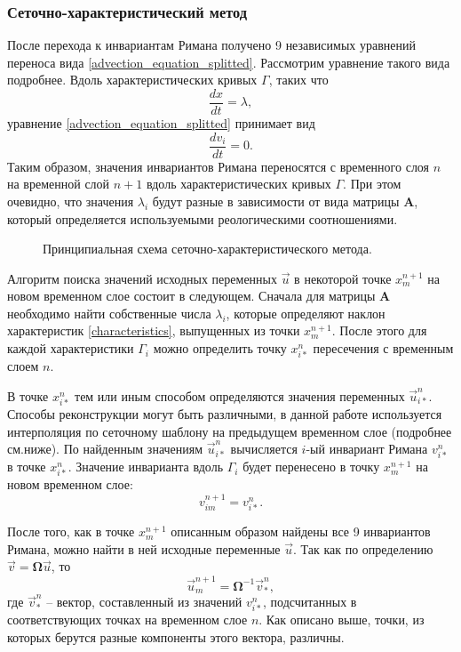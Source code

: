 \subsubsection{Сеточно-характеристический метод}

После перехода к инвариантам Римана получено 9 независимых уравнений переноса вида \ref{advection_equation_splitted}. Рассмотрим уравнение такого вида подробнее. Вдоль характеристических кривых $\Gamma$, таких что
\begin{equation}
\label{characteristics}
\frac{dx}{dt} = \lambda,
\end{equation}
уравнение \ref{advection_equation_splitted} принимает вид 
\begin{equation}
\label{characteristic_equation}
\frac{dv_i}{dt} = 0.
\end{equation}
Таким образом, значения инвариантов Римана переносятся с временного слоя $n$ на временной слой $n+1$ вдоль характеристических кривых $\Gamma$. При этом очевидно, что значения $\lambda_i$ будут разные в зависимости от вида матрицы $\mathbf A$, который определяется используемыми реологическими соотношениями.

\begin{figure}[h]
\caption{Принципиальная схема сеточно-характеристического метода.}
\end{figure}

Алгоритм поиска значений исходных переменных $\vec u$ в некоторой точке $x_m^{n+1}$ на новом временном слое состоит в следующем. Сначала для матрицы $\mathbf A$ необходимо найти собственные числа $\lambda_i$, которые определяют наклон характеристик \ref{characteristics}, выпущенных из точки $x_m^{n+1}$. После этого для каждой характеристики $\Gamma_i$ можно определить точку $x_{i*}^n$ пересечения с временным слоем $n$.

В точке $x_{i*}^n$ тем или иным способом определяются значения переменных $\vec u_{i*}^n$. Способы реконструкции могут быть различными, в данной работе используется интерполяция по сеточному шаблону на предыдущем временном слое (подробнее см.ниже). По найденным значениям $\vec u_{i*}^n$ вычисляется $i$-ый инвариант Римана $v_{i*}^n$ в точке $x_{i*}^n$. Значение инварианта вдоль $\Gamma_i$ будет перенесено в точку $x_m^{n+1}$ на новом временном слое:
\begin{equation}
v_{im}^{n+1} = v_{i*}^n.
\end{equation}

После того, как в точке $x_m^{n+1}$ описанным образом найдены все 9 инвариантов Римана, можно найти в ней исходные переменные $\vec u$. Так как по определению ${\vec v}=\mathbf\Omega{\vec u}$, то
\begin{equation}
{\vec u}_m^{n+1}=\mathbf\Omega^{-1}{\vec v}_*^n,
\end{equation}
где ${\vec v}_*^n$ -- вектор, составленный из значений $v_{i*}^n$, подсчитанных в соответствующих точках на временном слое $n$. Как описано выше, точки, из которых берутся разные компоненты этого вектора, различны.

